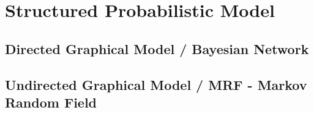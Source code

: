 \chapter{Structured Probabilistic Model}

\section{Directed Graphical Model / Bayesian Network}

\section{Undirected Graphical Model / MRF - Markov Random Field}